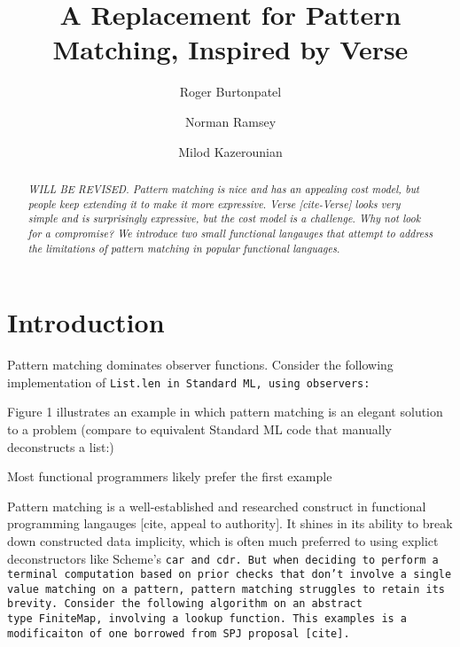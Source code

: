 \documentclass[manuscript,screen,review, 12pt]{acmart}
\begin{document}
\title{A Replacement for Pattern Matching, Inspired by Verse}

\author{Roger Burtonpatel}

\author{Norman Ramsey}

\author{Milod Kazerounian}

\renewcommand{\shortauthors}{Burtonpatel et al.}

\begin{abstract}
    \it{WILL BE REVISED.}
  Pattern matching is nice and has an appealing cost model, but people keep
  extending it to make it more expressive. Verse [cite-Verse] looks very simple
  and is surprisingly expressive, but the cost model is a challenge. Why not
  look for a compromise? We introduce two small functional langauges that
  attempt to address the limitations of pattern matching in popular functional
  languages.
  \end{abstract}

\maketitle

\section{Introduction}

    Pattern matching dominates observer functions. Consider the following
    implementation of \tt{List.len} in Standard ML, using observers:
    
    
    Figure 1 illustrates an example in which pattern matching is an elegant solution
    to a problem (compare to equivalent Standard ML code that manually deconstructs
    a list:)
    
    
    Most functional programmers likely prefer the first example 
    
    
    Pattern matching is a well-established and researched construct in functional
    programming langauges [cite, appeal to authority]. It shines in its ability to
    break down constructed data implicity, which is often much preferred to using
    explict deconstructors like Scheme's \tt{car} and \tt{cdr}. But when deciding to
    perform a terminal computation based on prior checks that don't involve a single
    value matching on a pattern, pattern matching struggles to retain its brevity.
    Consider the following algorithm on an abstract type~\tt{FiniteMap}, involving a
    lookup function. This examples is a modificaiton of one borrowed from SPJ
    proposal [cite]. 
    
\end{document}
